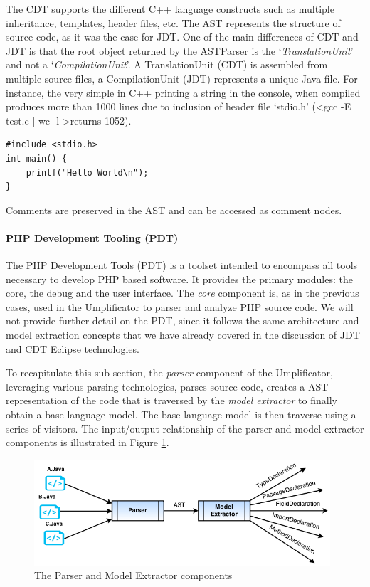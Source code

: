 The CDT supports the different C++ language constructs such as multiple inheritance, templates, header files, etc.
The AST represents the structure of source code, as it was the case for JDT.  One of the main differences of CDT and JDT is that the root object returned by the ASTParser is the `\textit{TranslationUnit}' and not a `\textit{CompilationUnit}'. 
A TranslationUnit (CDT) is assembled from multiple source files, a CompilationUnit (JDT) represents a unique Java file.
For instance, the very simple in C++ printing a string in the console, when compiled produces more than 1000 lines due to inclusion of header file `stdio.h' (\textless gcc -E test.c | wc -l \textgreater returns 1052).

\begin{lstlisting}[style=java, caption=Simple Example in C++ - test.c , label=lst:cdtsimple]
#include <stdio.h>
int main() {
	printf("Hello World\n");
}
\end{lstlisting}

Comments are preserved in the AST and can be accessed as comment nodes.

\paragraph*{PHP Development Tooling (PDT)}

The PHP Development Tools (PDT) is a toolset intended to encompass all tools necessary to develop PHP based software. 
It provides the primary modules: the core, the debug and the user interface. The \textit{core} component is, as in the previous cases, used in the Umplificator to parser and analyze PHP source code.
We will not provide further detail on the PDT, since it follows the same architecture and model extraction concepts that we have already covered in the discussion of JDT and CDT Eclipse technologies.

To recapitulate this sub-section, the \textit{parser} component of the Umplificator, leveraging various parsing technologies, parses source code, creates a AST representation of the code that is traversed by the \textit{model extractor} to finally obtain a base language model. The base language model is then traverse using a series of visitors. The input/output relationship of the parser and model extractor components is illustrated in Figure \ref{fig:parserINOut}. 

\begin{figure}[h]
\centering
\includegraphics[width=0.98\textwidth]{Figures/parserINOut.png}
\caption{The Parser and Model Extractor components}
\label{fig:parserINOut}
\end{figure}

